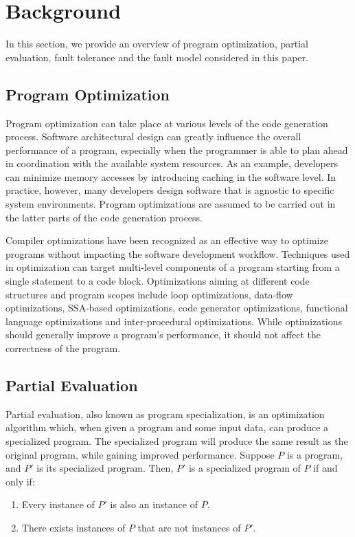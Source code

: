 \section{Background}
\label{sec:background}

In this section, we provide an overview of program optimization, partial evaluation, fault tolerance and the fault model considered in this paper.

\subsection{Program Optimization}
\label{sec:program_opt}
Program optimization can take place at various levels of the code generation process.
Software architectural design can greatly influence the overall performance of a program, especially when the programmer is able to plan ahead in coordination with the available system resources.
As an example, developers can minimize memory accesses by introducing caching in the software level.
In practice, however, many developers design software that is agnostic to specific system environments.
Program optimizations are assumed to be carried out in the latter parts of the code generation process. 

Compiler optimizations have been recognized as an effective way to optimize programs without impacting the software development workflow.
Techniques used in optimization can target multi-level components of a program starting from a single statement to a code block. 
Optimizations aiming at different code structures and program scopes include loop optimizations, data-flow optimizations, SSA-based optimizations, code generator optimizations, functional language optimizations and inter-procedural optimizations. While optimizations should generally improve a program's performance, it should not affect the correctness of the program.

\subsection{Partial Evaluation}
\label{sec:partial_evaluation}
Partial evaluation, also known as program specialization, is an optimization algorithm which, when given a program and some input data, can produce a specialized program. The specialized program will produce the same result as the original program, while gaining improved performance. Suppose $P$ is a program, and $P'$ is its specialized program. Then, $P'$ is a specialized program of $P$ if and only if:
\begin{enumerate}
\item Every instance of $P'$ is also an instance of $P$.
\item There exists instances of $P$ that are not instances of $P'$.
\end{enumerate}

